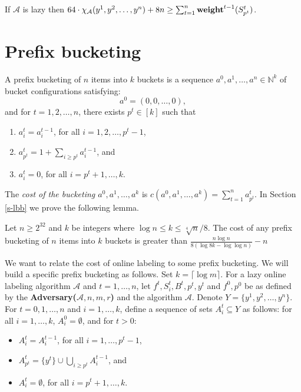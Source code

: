\documentclass[runningheads,a4paper]{llncs}
\newcommand{\A}{\mathcal{A}}
\newcommand{\N}{\mathbb{N}}
\newcommand{\weight}{{\rm {\bf weight}}}
\begin{document}
\begin{corollary}\label{c-main}
If $\A$ is lazy then $64 \cdot \chi_\A(y^1,y^2,\dots,y^n) + 8n \ge \sum_{t=1}^n \weight^{t-1}(S^t_{p^t})$.
\end{corollary}


\section{Prefix bucketing}

A prefix bucketing of $n$ items into $k$ buckets is a sequence $a^0,a^1,\dots,a^n\in \N^k$ of bucket configurations
satisfying:
\[
a^0 = (0,0,\dots,0),
\]
and for $t=1,2,\dots,n$, there exists $p^{t} \in [k]$ such that
\begin{enumerate}
\item $a^t_i = a^{t-1}_i$, for all $i=1,2,\dots,p^{t}-1$, 
\item $a^t_{p^{t}} = 1+ \sum_{i\ge p^{t}} a^{t-1}_i$, and
\item $a^t_i = 0$, for all $i=p^{t}+1,\dots,k$.
\end{enumerate}

The \emph{cost of the bucketing $a^0,a^1,\dots,a^k$} is $c(a^0,a^1,\dots,a^k) = \sum_{t=1}^n a^t_{p^{t}}$. In Section \ref{s-lbb}
we prove the following lemma.

\begin{lemma}\label{l-lbb}
Let $n \ge 2^{32}$ and $k$ be integers where $\log n \le k \le \sqrt[4]{n}/8$.
The cost of any prefix bucketing of $n$ items into $k$ buckets is greater than $\frac{n \log n}{8 (\log 8k - \log \log n)} - n$
\end{lemma}

We want to relate the cost of online labeling to some prefix bucketing. We will build a specific prefix
bucketing as follows. Set $k=\lceil \log m\rceil$.
For a lazy online labeling algorithm $\A$ and $t=1,\dots,n$, let $f^t,S^t_i,B^t,p^{t},y^t$ and $f^0,p^0$ be as 
defined by the {\bf Adversary($\A,n,m,r$)} and the algorithm $\A$. Denote $Y=\{y^1,y^2,\dots,y^n\}$.
For $t=0,1,\dots,n$ and $i=1,\dots,k$, define a sequence of sets $A^t_i \subseteq Y$ as follows:
for all $i=1,\dots,k$, $A^0_i = \emptyset$, and for $t>0$:
\begin{itemize}
\item $A^t_i = A^{t-1}_i$, for all $i=1,\dots,p^{t}-1$, 
\item $A^t_{p^{t}} = \{y^t\} \cup \bigcup_{i\ge p^{t}} A^{t-1}_i$, and
\item $A^t_i = \emptyset$, for all $i=p^{t}+1,\dots, k$.
\end{itemize} 
\end{document}
